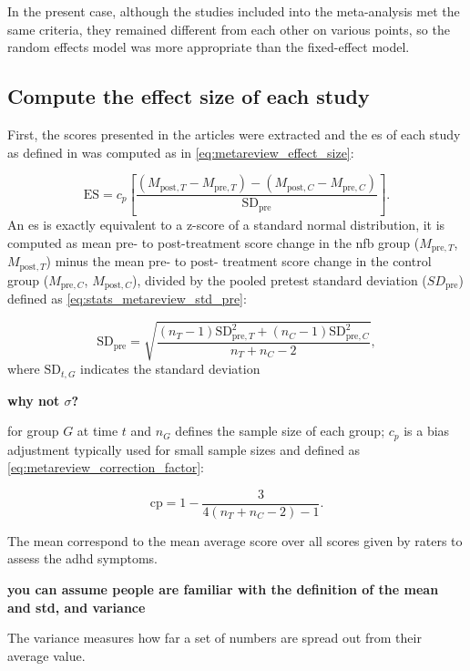 \documentclass[12pt,a4paper,english]{article}
\newcommand{\comment}[1]
{\par {\bfseries \color{blue} #1 \par}} %
\begin{document}
In the present case, although the studies included into the meta-analysis met the same criteria, they remained different from each other 
on various points, so the random effects model was more appropriate than the fixed-effect model.  

\subsection{Compute the effect size of each study}

First, the scores presented in the articles were extracted and the \gls{es} of each study as defined in \citet{Morris2008} 
was computed as in \cref{eq:metareview_effect_size}:

\begin{equation}
\label{eq:metareview_effect_size}
\text{ES} = c_p \left[ \frac{(M_{\text{post},T} - M_{\text{pre},T}) - (M_{\text{post},C} - M_{\text{pre},C}) }{\text{SD}_{\text{pre}}} \right ].
\end{equation} 
An \gls{es} is exactly equivalent to a z-score of a standard normal distribution, it is computed as mean pre- to post-treatment 
score change in the \gls{nfb} group ($M_{\text{pre},T}$, $M_{\text{post},T}$) minus the mean pre- to post- treatment score change 
in the control group ($M_{\text{pre},C}$, $M_{\text{post},C}$), divided by the pooled pretest standard deviation ($SD_{\text{pre}}$) 
defined as \cref{eq:stats_metareview_std_pre}:

\begin{equation}
\label{eq:stats_metareview_std_pre}
\text{SD}_{\text{pre}} = \sqrt{\frac{(n_T - 1)\text{SD}_{\text{pre},T}^2 + (n_C - 1)\text{SD}_{\text{pre},C}^2} {n_T + n_C - 2}},
\end{equation}
where $\text{SD}_{t,G}$ indicates the standard deviation\comment{why not $\sigma$?} for group $G$ at time $t$ and $n_G$ defines the sample size of each group; 
$c_p$ is a bias adjustment typically used for small sample sizes and defined as \cref{eq:metareview_correction_factor}:

\begin{equation}
\label{eq:metareview_correction_factor}
\text{cp} =  1 - \frac{3} {4(n_T + n_C - 2) - 1}. 
\end{equation} 

The mean correspond to the mean average score over all scores given by raters to assess the \gls{adhd} symptoms. 
\comment{you can assume people are familiar with the definition of the mean and std, and variance} The variance measures how
 far a set of numbers are spread out from their average value. 
\end{document}

